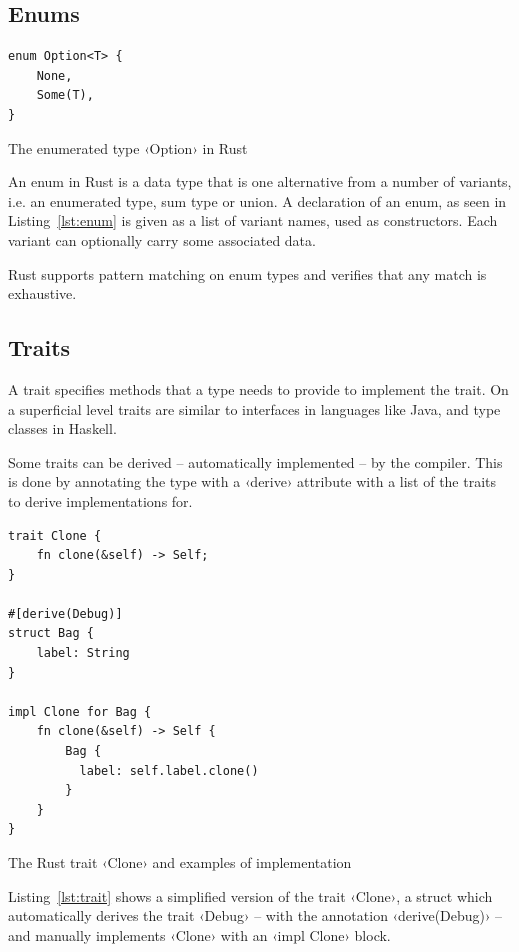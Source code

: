 \subsection{Enums}

\begin{listing}[ht!]
\begin{verbatim}
enum Option<T> {
    None,
    Some(T),
}
\end{verbatim}
\caption{The enumerated type ‹Option› in Rust}
\label{lst:enum}
\end{listing}

An enum in Rust is a data type that is one alternative from a number of variants, i.e. an enumerated type, sum type or union. A declaration of an enum, as seen in Listing~\ref{lst:enum} is given as a list of variant names, used as constructors. Each variant can optionally carry some associated data.

Rust supports pattern matching on enum types and verifies that any match is exhaustive.

\subsection{Traits}
\label{sec:traits}

A trait specifies methods that a type needs to provide to implement the trait. On a superficial level traits are similar to interfaces in languages like Java, and type classes in Haskell.

Some traits can be derived -- automatically implemented -- by the compiler. This is done by annotating the type with a ‹derive› attribute with a list of the traits to derive implementations for.

\begin{listing}[ht!]
\begin{verbatim}
trait Clone {
    fn clone(&self) -> Self;
}

#[derive(Debug)]
struct Bag {
    label: String
}

impl Clone for Bag {
    fn clone(&self) -> Self {
        Bag {
          label: self.label.clone()
        }
    }
}
\end{verbatim}
\caption{The Rust trait ‹Clone› and examples of implementation}
\label{lst:trait}
\end{listing}

Listing~\ref{lst:trait} shows a simplified version of the trait ‹Clone›, a struct which automatically derives the trait ‹Debug› -- with the annotation ‹derive(Debug)› -- and manually implements ‹Clone› with an ‹impl Clone› block.

